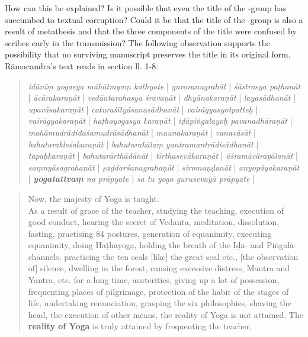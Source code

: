 How can this be explained? Is it possible that even the title of the \alpha-group has succumbed to textual corruption? Could it be that the title of the \alpha-group is also a result of metathesis and that the three components of the title were confused by scribes early in the transmission? The following observation supports the possibility that no surviving manuscript preserves the title in its original form. Rāmacandra's text reads in section  ll. 1-8:

\begin{quote}
  \label{mahatmya}
  \textit{idānīṃ yogasya māhātmyaṃ kathyate} |
  \textit{guroranugrahāt} | \textit{śāstrasya paṭhanāt} | \textit{ācārakaraṇāt} | \textit{vedāntarahasya śravaṇāt} |
  \textit{dhyānakaraṇāt} | \textit{layasādhanāt} | \textit{upavāsakaraṇāt} | \textit{caturaśītyāsanasādhanāt} | \textit{vairāgyasyotpatteḥ} | \textit{vairāgyakaraṇāt} | \textit{haṭhayogasya karaṇāt} | \textit{iḍāpiṅgalayoḥ pavanadhāraṇāt} | \textit{mahāmudrādidaśamudrāsādhanāt} | \textit{maunakaraṇāt} | \textit{vanavāsāt} | \textit{bahutarakleśakaraṇāt} | \textit{bahutarakālaṃ} \textit{yantramantrādisādhanāt} | \textit{tapaḥkaraṇāt} | \textit{bahutarārthādānāt} | \textit{tīrthasevākaraṇāt} | \textit{āśramācārapālanāt} | \textit{saṃnyāsagrahaṇāt} | \textit{ṣaḍdarśanagrahaṇāt} | \textit{siromaṇḍanāt} | \textit{anyopāyakaraṇāt} | \textit{\textbf{yogatattvaṃ} na prāpyate} | \textit{sa tu yogo gurusevayā prāpyate} |
\end{quote}

\begin{quote}
  Now, the majesty of Yoga is taught.\\
  As a result of grace of the teacher, studying the teaching, execution of good conduct, hearing the secret of Vedānta, meditation, dissolution, fasting, practising 84 postures, generation of equanimity, executing equanimity, doing Haṭhayoga, holding the breath of the Iḍā- and Piṅgalā-channels,  practicing the ten seals [like] the great-seal etc., [the observation of] silence, dwelling in the forest, causing excessive distress, Mantra and Yantra, etc. for a long time, austerities, giving up a lot of possession, frequenting places of pilgrimage, protection of the habit of the stages of life, undertaking renunciation, grasping the six philosophies, shaving the head, the execution of other means, the reality of Yoga is not attained. The \textbf{reality of Yoga} is truly attained by frequenting the teacher.
  \end{quote}

